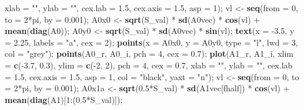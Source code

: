 \documentclass[]{article}
\newenvironment{Shaded}{\begin{snugshade}}{\end{snugshade}}
\newcommand{\KeywordTok}[1]{\textcolor[rgb]{0.13,0.29,0.53}{\textbf{{#1}}}}
\newcommand{\DataTypeTok}[1]{\textcolor[rgb]{0.13,0.29,0.53}{{#1}}}
\newcommand{\DecValTok}[1]{\textcolor[rgb]{0.00,0.00,0.81}{{#1}}}
\newcommand{\FloatTok}[1]{\textcolor[rgb]{0.00,0.00,0.81}{{#1}}}
\newcommand{\StringTok}[1]{\textcolor[rgb]{0.31,0.60,0.02}{{#1}}}
\newcommand{\NormalTok}[1]{{#1}}
\begin{document}
\begin{Shaded}
\begin{Highlighting}[]
         \DataTypeTok{xlab =} \StringTok{""}\NormalTok{, }\DataTypeTok{ylab =} \StringTok{""}\NormalTok{, }\DataTypeTok{cex.lab =} \FloatTok{1.5}\NormalTok{, }\DataTypeTok{cex.axis =} \FloatTok{1.5}\NormalTok{, }\DataTypeTok{asp =} \DecValTok{1}\NormalTok{);}
    \NormalTok{vl   <-}\StringTok{ }\KeywordTok{seq}\NormalTok{(}\DataTypeTok{from =} \DecValTok{0}\NormalTok{, }\DataTypeTok{to =} \DecValTok{2}\NormalTok{*pi, }\DataTypeTok{by =} \FloatTok{0.001}\NormalTok{);}
    \NormalTok{A0x0 <-}\StringTok{ }\KeywordTok{sqrt}\NormalTok{(S_val) *}\StringTok{ }\KeywordTok{sd}\NormalTok{(A0vec) *}\StringTok{ }\KeywordTok{cos}\NormalTok{(vl) +}\StringTok{ }\KeywordTok{mean}\NormalTok{(}\KeywordTok{diag}\NormalTok{(A0));}
    \NormalTok{A0y0 <-}\StringTok{ }\KeywordTok{sqrt}\NormalTok{(S_val) *}\StringTok{ }\KeywordTok{sd}\NormalTok{(A0vec) *}\StringTok{ }\KeywordTok{sin}\NormalTok{(vl);}
    \KeywordTok{text}\NormalTok{(}\DataTypeTok{x =} \NormalTok{-}\FloatTok{3.5}\NormalTok{, }\DataTypeTok{y =} \FloatTok{2.25}\NormalTok{, }\DataTypeTok{labels =} \StringTok{"a"}\NormalTok{, }\DataTypeTok{cex =} \DecValTok{2}\NormalTok{);}
    \KeywordTok{points}\NormalTok{(}\DataTypeTok{x =} \NormalTok{A0x0, }\DataTypeTok{y =} \NormalTok{A0y0, }\DataTypeTok{type =} \StringTok{"l"}\NormalTok{, }\DataTypeTok{lwd =} \DecValTok{3}\NormalTok{, }\DataTypeTok{col =} \StringTok{"grey"}\NormalTok{);}
    \KeywordTok{points}\NormalTok{(A0_r, A0_i, }\DataTypeTok{pch =} \DecValTok{4}\NormalTok{, }\DataTypeTok{cex =} \FloatTok{0.7}\NormalTok{);}
    \KeywordTok{plot}\NormalTok{(A1_r, A1_i, }\DataTypeTok{xlim =} \KeywordTok{c}\NormalTok{(-}\FloatTok{3.7}\NormalTok{, }\FloatTok{0.3}\NormalTok{), }\DataTypeTok{ylim =} \KeywordTok{c}\NormalTok{(-}\DecValTok{2}\NormalTok{, }\DecValTok{2}\NormalTok{), }\DataTypeTok{pch =} \DecValTok{4}\NormalTok{, }\DataTypeTok{cex =} \FloatTok{0.7}\NormalTok{,}
         \DataTypeTok{xlab =} \StringTok{""}\NormalTok{, }\DataTypeTok{ylab =} \StringTok{""}\NormalTok{, }\DataTypeTok{cex.lab =} \FloatTok{1.5}\NormalTok{, }\DataTypeTok{cex.axis =} \FloatTok{1.5}\NormalTok{, }\DataTypeTok{asp =} \DecValTok{1}\NormalTok{, }
         \DataTypeTok{col =} \StringTok{"black"}\NormalTok{, }\DataTypeTok{yaxt =} \StringTok{"n"}\NormalTok{);}
    \NormalTok{vl <-}\StringTok{ }\KeywordTok{seq}\NormalTok{(}\DataTypeTok{from =} \DecValTok{0}\NormalTok{, }\DataTypeTok{to =} \DecValTok{2}\NormalTok{*pi, }\DataTypeTok{by =} \FloatTok{0.001}\NormalTok{);}
    \NormalTok{A0x1a <-}\StringTok{ }\KeywordTok{sqrt}\NormalTok{(}\FloatTok{0.5}\NormalTok{*S_val) *}\StringTok{ }\KeywordTok{sd}\NormalTok{(A1vec[fhalf]) *}\StringTok{ }\KeywordTok{cos}\NormalTok{(vl) +}\StringTok{ }\KeywordTok{mean}\NormalTok{(}\KeywordTok{diag}\NormalTok{(A1)[}\DecValTok{1}\NormalTok{:(}\FloatTok{0.5}\NormalTok{*S_val)]);}

\end{Highlighting}
\end{Shaded}
\end{document}
